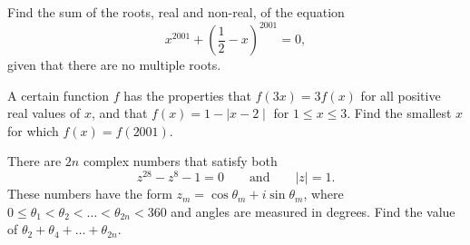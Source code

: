 \begin{question}[name={2001 AIME I, \href{https://artofproblemsolving.com/community/c4p384175}{Problem 3}}]
	Find the sum of the roots, real and non-real, of the equation $$x^{2001}+\left(\frac 12-x\right)^{2001}=0,$$ given that there are no multiple roots.
\end{question}


%	



















\begin{question}[name={2001 AIME II, \href{https://artofproblemsolving.com/community/c4p714302}{Problem 8}}]
	A certain function $f$ has the properties that $f(3x)=3f(x)$ for all positive real values of $x$, and that $f(x)=1-\mid x-2 \mid$ for $1\leq x \leq 3$. Find the smallest $x$ for which $f(x)=f(2001)$.
\end{question}


%	












\begin{question}[name={2001 AIME II, \href{https://artofproblemsolving.com/community/c4p714311}{Problem 14}}]
	There are $2n$ complex numbers that satisfy both $$z^{28}-z^{8}-1=0 \qquad \text{and} \qquad  |z|=1.$$ These numbers have the form $z_{m}=\cos\theta_{m}+i\sin\theta_{m}$, where $0\leq\theta_{1}<\theta_{2}< \dots <\theta_{2n}<360$ and angles are measured in degrees. Find the value of $\theta_{2}+\theta_{4}+\dots+\theta_{2n}$.	
	
\end{question}


%	













